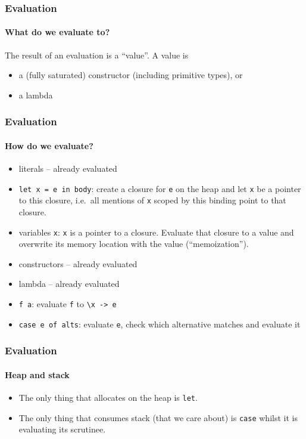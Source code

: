 \documentclass{beamer}
\begin{document}
\begin{frame}
\frametitle{Evaluation}
\framesubtitle{What do we evaluate to?}

The result of an evaluation is a ``value''.  A value is

\begin{itemize}
\item a (fully saturated) constructor (including primitive types), or
\item a lambda
\end{itemize}

\end{frame}

\begin{frame}[fragile]
  \frametitle{Evaluation}
  \framesubtitle{How do we evaluate?}

  \begin{itemize}
  \item literals -- already evaluated

  \item \verb+let x = e in body+: create a closure for \verb+e+ on the
    heap and let \verb+x+ be a pointer to this closure, i.e.\ all
    mentions of \verb+x+ scoped by this binding point to that closure.

  \item variables \verb+x+: \verb+x+ is a pointer to a closure.
    Evaluate that closure to a value and overwrite its memory location
    with the value (``memoization'').
  \item constructors -- already evaluated
  \item lambda -- already evaluated
  \item \verb+f a+: evaluate \verb+f+ to \verb+\x -> e+
  \item \verb+case e of alts+: evaluate \verb+e+, check which
    alternative matches and evaluate it
  \end{itemize}

\end{frame}

\begin{frame}[fragile]
  \frametitle{Evaluation}
  \framesubtitle{Heap and stack}

  \begin{itemize}
  \item The only thing that allocates on the heap is \verb+let+.

  \item The only thing that consumes stack (that we care about) is
    \verb+case+ whilst it is evaluating its scrutinee.
  \end{itemize}

\end{frame}
\end{document}
